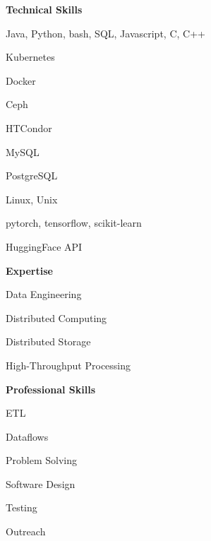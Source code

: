 \documentclass[12pt]{article}
\newcommand{\mynewsubsection}[2]{%
  \medskip
  {\color{colorsection}{#1} {\large \textbf{#2}}}}
\begin{document}
\begin{minipage}[t]{0.29\linewidth}

  \mynewsubsection{\faTasks}{Technical Skills}

  \medskip

  Java, Python, bash, SQL, Javascript, C, C++

  \medskip

  Kubernetes

  \medskip

  Docker

  \medskip

  Ceph

  \medskip

  HTCondor

  \medskip

  MySQL

  \medskip

  PostgreSQL

  \medskip

  Linux, Unix

  \medskip

  pytorch, tensorflow, scikit-learn

  HuggingFace API
  
  \medskip
  \medskip

  \mynewsubsection{\faUserNinja}{Expertise}

  \medskip
  
  Data Engineering

  \medskip
  
  Distributed Computing

  \medskip

  Distributed Storage

  \medskip

  High-Throughput Processing

  \medskip
  \medskip

  \mynewsubsection{\faToolbox}{Professional Skills}

  \medskip

  ETL

  \medskip

  Dataflows

  \medskip

  Problem Solving

  \medskip

  Software Design

  \medskip

  Testing
  
  \medskip

  Outreach

\end{minipage}\hfill
\end{document}

